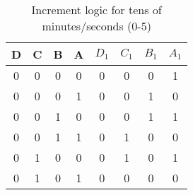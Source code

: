 \begin{table}[ht]
\centering
\caption{Increment logic for tens of minutes/seconds (0-5)}
\begin{tabular}{|c|c|c|c|c|c|c|c|}
\hline
D & C & B & A & $D_1$ & $C_1$ & $B_1$ & $A_1$ \\ 
\hline
0 & 0 & 0 & 0 & 0 & 0 & 0 & 1 \\
0 & 0 & 0 & 1 & 0 & 0 & 1 & 0 \\
0 & 0 & 1 & 0 & 0 & 0 & 1 & 1 \\
0 & 0 & 1 & 1 & 0 & 1 & 0 & 0 \\
0 & 1 & 0 & 0 & 0 & 1 & 0 & 1 \\
0 & 1 & 0 & 1 & 0 & 0 & 0 & 0 \\
\hline
\end{tabular}
\end{table}
